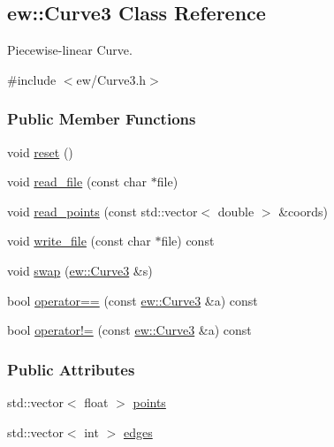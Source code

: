\hypertarget{classew_1_1Curve3}{
\subsection{ew::Curve3 Class Reference}
\label{classew_1_1Curve3}
}


Piecewise-\/linear Curve.  




{\ttfamily \#include $<$ew/Curve3.h$>$}

\subsubsection*{Public Member Functions}
\begin{DoxyCompactItemize}
\item 
void \hyperlink{classew_1_1Curve3_a95a72b61fbf434beac0249208a4515b1}{reset} ()
\item 
void \hyperlink{classew_1_1Curve3_a621f9ac655f597b8155b856d2fcce723}{read\_\-file} (const char $\ast$file)
\item 
void \hyperlink{classew_1_1Curve3_aafce19cb266f66c940e210c9cc9008bb}{read\_\-points} (const std::vector$<$ double $>$ \&coords)
\item 
void \hyperlink{classew_1_1Curve3_a3fdf3122c89eca2c6190eb2162d08695}{write\_\-file} (const char $\ast$file) const 
\item 
void \hyperlink{classew_1_1Curve3_af96ad8ce0f90919eeaa0716c3f64355c}{swap} (\hyperlink{classew_1_1Curve3}{ew::Curve3} \&s)
\item 
bool \hyperlink{classew_1_1Curve3_ac59817bbc1f4cbfbc64727ffded6a123}{operator==} (const \hyperlink{classew_1_1Curve3}{ew::Curve3} \&a) const 
\item 
bool \hyperlink{classew_1_1Curve3_aee23523f6117834d2f91a053ae9db22a}{operator!=} (const \hyperlink{classew_1_1Curve3}{ew::Curve3} \&a) const 
\end{DoxyCompactItemize}
\subsubsection*{Public Attributes}
\begin{DoxyCompactItemize}
\item 
std::vector$<$ float $>$ \hyperlink{classew_1_1Curve3_aca6992a3b3b6fb8d27824437c55d8c35}{points}
\item 
std::vector$<$ int $>$ \hyperlink{classew_1_1Curve3_a5fb191b14f5b7dceb04eeebf9e7171d3}{edges}
\end{DoxyCompactItemize}


